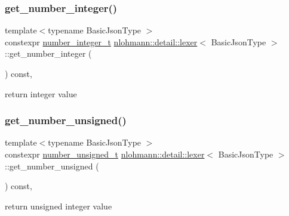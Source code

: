 \subsubsection{\texorpdfstring{get\+\_\+number\+\_\+integer()}{get\_number\_integer()}}
{\footnotesize\ttfamily template$<$typename Basic\+Json\+Type $>$ \\
constexpr \hyperlink{classnlohmann_1_1detail_1_1lexer_a9cd1b11cc67edbfb2613c788b5bd337c}{number\+\_\+integer\+\_\+t} \hyperlink{classnlohmann_1_1detail_1_1lexer}{nlohmann\+::detail\+::lexer}$<$ Basic\+Json\+Type $>$\+::get\+\_\+number\+\_\+integer (\begin{DoxyParamCaption}{ }\end{DoxyParamCaption}) const\hspace{0.3cm}{\ttfamily [inline]}, {\ttfamily [noexcept]}}



return integer value 

\mbox{\label{classnlohmann_1_1detail_1_1lexer_a56640fb92293e0c17742ca3c814d74d6}} 
\subsubsection{\texorpdfstring{get\+\_\+number\+\_\+unsigned()}{get\_number\_unsigned()}}
{\footnotesize\ttfamily template$<$typename Basic\+Json\+Type $>$ \\
constexpr \hyperlink{classnlohmann_1_1detail_1_1lexer_a105d1dfeab414a572655895cdd96a52a}{number\+\_\+unsigned\+\_\+t} \hyperlink{classnlohmann_1_1detail_1_1lexer}{nlohmann\+::detail\+::lexer}$<$ Basic\+Json\+Type $>$\+::get\+\_\+number\+\_\+unsigned (\begin{DoxyParamCaption}{ }\end{DoxyParamCaption}) const\hspace{0.3cm}{\ttfamily [inline]}, {\ttfamily [noexcept]}}



return unsigned integer value 

\mbox{\label{classnlohmann_1_1detail_1_1lexer_abf5143501435f9f79898c1ff238c2622}} 

